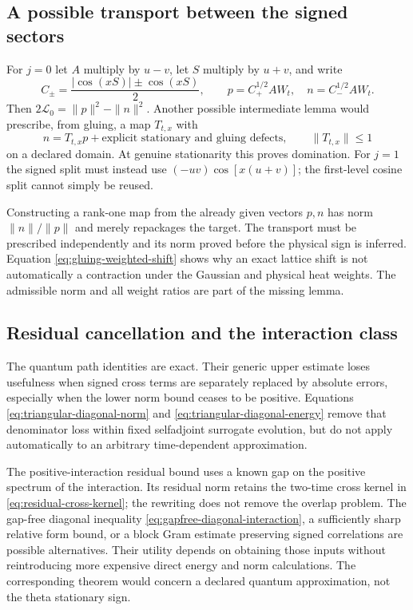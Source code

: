 \documentclass[11pt]{article}
\numberwithin{equation}{section}
\theoremstyle{definition}
\theoremstyle{remark}
\begin{document}
\subsection{A possible transport between the signed sectors}
For $j=0$ let $A$ multiply by $u-v$, let $S$ multiply by $u+v$, and
write
\begin{equation}
 C_\pm=\frac{|\cos(xS)|\pm\cos(xS)}2,\qquad
 p=C_+^{1/2}AW_t,\quad n=C_-^{1/2}AW_t.
\end{equation}
Then $2\mathscr L_0=\|p\|^2-\|n\|^2$. Another possible intermediate
lemma would prescribe, from gluing, a map $T_{t,x}$ with
\begin{equation}\label{eq:open-contraction}
 n=T_{t,x}p+\text{explicit stationary and gluing defects},
 \qquad \|T_{t,x}\|\le1
\end{equation}
on a declared domain. At genuine stationarity this proves domination.
For $j=1$ the signed split must instead use $(-uv)\cos[x(u+v)]$;
the first-level cosine split cannot simply be reused.

Constructing a rank-one map from the already given vectors $p,n$ has
norm $\|n\|/\|p\|$ and merely repackages the target. The transport must
be prescribed independently and its norm proved before the physical sign
is inferred. Equation \eqref{eq:gluing-weighted-shift} shows why an exact
lattice shift is not automatically a contraction under the Gaussian and
physical heat weights. The admissible norm and all weight ratios are part
of the missing lemma.

\subsection{Residual cancellation and the interaction class}
The quantum path identities are exact. Their generic upper estimate loses
usefulness when signed cross terms are separately replaced by absolute
errors, especially when the lower norm bound ceases to be positive.
Equations \eqref{eq:triangular-diagonal-norm} and
\eqref{eq:triangular-diagonal-energy} remove that denominator loss within
fixed selfadjoint surrogate evolution, but do not apply automatically to
an arbitrary time-dependent approximation.

The positive-interaction residual bound uses a known gap on the positive
spectrum of the interaction. Its residual norm retains the two-time cross
kernel in \eqref{eq:residual-cross-kernel}; the rewriting does not remove
the overlap problem. The gap-free diagonal inequality
\eqref{eq:gapfree-diagonal-interaction}, a sufficiently sharp relative
form bound, or a block Gram estimate preserving signed correlations are
possible alternatives. Their utility depends on obtaining those inputs
without reintroducing more expensive direct energy and norm calculations.
The corresponding theorem would concern a declared quantum approximation,
not the theta stationary sign.
\end{document}
